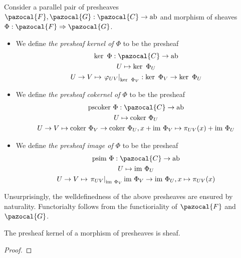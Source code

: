 \begin{definition}
     Consider a parallel pair of presheaves $\pazocal{F},\pazocal{G}: \pazocal{C}\rightarrow \mathrm{ab}$ and morphism of sheaves $\Phi: \pazocal{F}\Rightarrow \pazocal{G}$. 
    \begin{itemize}
        \item We define \emph{the presheaf kernel of $\Phi$} to be the presheaf 
    \begin{gather*}
        \ker \ \Phi: \pazocal{C} \rightarrow \mathrm{ab}\\
        U \mapsto \ker\ \Phi_U\\
        U\rightarrow V \mapsto \left.\varphi_{UV}\right|_{\ker\ \Phi_V} : \ker \ \Phi_V \rightarrow \ker \ \Phi_U
    \end{gather*}
    \item  We define \emph{the presheaf cokernel of $\Phi$} to be the presheaf 
    \begin{gather*}
        \mathrm{pscoker} \  \Phi: \pazocal{C}\rightarrow \mathrm{ab}\\
        U \mapsto \coker\ \Phi_U\\
        U\rightarrow V \mapsto \coker\ \Phi_V \rightarrow \coker\ \Phi_U, x+ \im \ \Phi_V \mapsto \pi_{UV}(x) + \im\ \Phi_U  
    \end{gather*}
    \item We define \emph{the presheaf image of $\Phi$} to be the presheaf
    \begin{gather*}
        \mathrm{psim}\ \Phi : \pazocal{C}\rightarrow \mathrm{ab}\\
        U\mapsto \im \ \Phi_U\\
        U\rightarrow V\mapsto \left.\pi_{UV}\right|_{\im \ \Phi_V} \im \ \Phi_V\rightarrow \im \ \Phi_U, x\mapsto \pi_{UV}(x) 
    \end{gather*}
    \end{itemize}
\end{definition}
\begin{remark}
    Unsurprisingly, the welldefinedness of the above presheaves are ensured by naturality. Functorialty follows from the functioriality of $\pazocal{F}$ and $\pazocal{G}$.
\end{remark}
\begin{lemma}
    The presheaf kernel of a morphism of presheaves is sheaf.
\end{lemma}
\begin{proof}
    
\end{proof}
